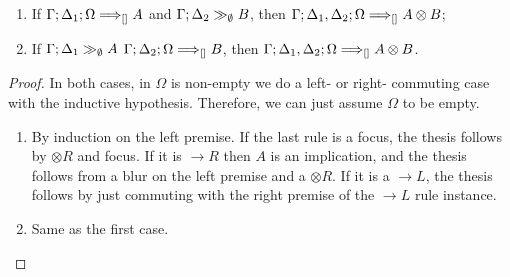 \begin{lemma}\label{otimeslemma}\mbox{}
  \begin{enumerate}
  \item If $\Gamma; \Delta_1; \Omega \Longrightarrow_{[]} A$ and
    $\Gamma; \Delta_2 \gg_{\emptyset} B$, then
    $\Gamma; \Delta_1, \Delta_2; \Omega \Longrightarrow_{[]} A \otimes B$;
  \item If $\Gamma; \Delta_1 \gg_{\emptyset} A$
    $\Gamma; \Delta_2; \Omega \Longrightarrow_{[]} B$, then
    $\Gamma; \Delta_1, \Delta_2; \Omega \Longrightarrow_{[]} A \otimes B$.
  \end{enumerate}
\end{lemma}
\begin{proof}
  In both cases, in $\Omega$ is non-empty we do a left- or right- commuting case
  with the inductive hypothesis. Therefore, we can just assume $\Omega$ to be
  empty.

  \begin{enumerate}
  \item

    By induction on the left premise. If the last rule is a focus, the thesis
    follows by $\otimes R$ and focus. If it is $\rightarrow R$ then $A$ is an
    implication, and the thesis follows from a blur on the left premise and a
    $\otimes R$. If it is a $\rightarrow L$, the thesis follows by just
    commuting with the right premise of the $\rightarrow L$ rule instance.

  \item Same as the first case.

  \end{enumerate}
\end{proof}

